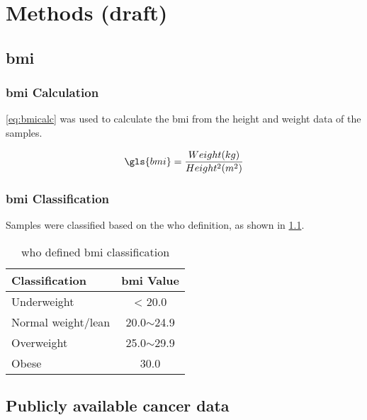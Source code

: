 \chapter{Methods (draft)}
\label{ch:methods}

\section{\gls{bmi}}
\label{sec:bmi}

\subsection{\gls{bmi} Calculation}
\label{subsec:bmicalc}

\cref{eq:bmicalc}  was used to calculate the \gls{bmi} from the height and weight data of the samples.

\begin{equation}
	\label{eq:bmicalc}
	\gls{bmi} = \frac{Weight (kg)}{Height^2(m^2)}\\
\end{equation}

\subsection{\gls{bmi} Classification}
\label{subsec:bmiclassification}

Samples were classified based on the \gls{who} definition, as shown in \cref{tab:whobmiclass}.
\begin{table}[hb]
	\caption{\gls{who} defined \gls{bmi} classification}
	\label{tab:whobmiclass}
	\begin{center}
		\begin{tabular}{lc}
			\bfseries {Classification} & \bfseries {\gls{bmi} Value}\\
			\hline
			\rule{0pt}{2.25ex}Underweight & \textless{} 20.0\\
			Normal weight/lean & 20.0$\sim$24.9\\
			Overweight & 25.0$\sim$29.9\\
			Obese & \geq{} 30.0\\
		\end{tabular}
	\end{center}
\end{table}

\section{Publicly available cancer data}
\label{sec:data}

